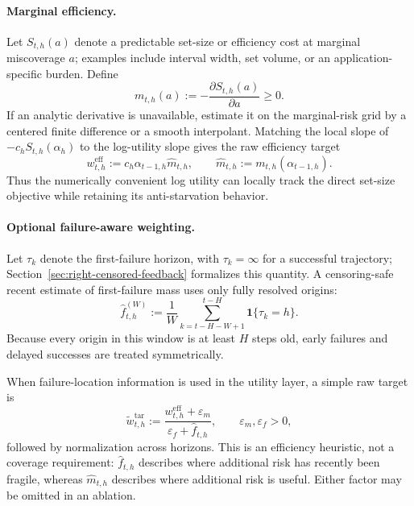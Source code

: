 \documentclass[11pt]{article}
\begin{document}
\paragraph{Marginal efficiency.}
Let $S_{t,h}(a)$ denote a predictable set-size or efficiency cost at marginal
miscoverage $a$; examples include interval width, set volume, or an
application-specific burden.  Define
\begin{equation}
    m_{t,h}(a)
    :=
    -\frac{\partial S_{t,h}(a)}{\partial a}\ge0.
    \label{eq:marginal-set-efficiency}
\end{equation}
If an analytic derivative is unavailable, estimate it on the marginal-risk
grid by a centered finite difference or a smooth interpolant.  Matching the
local slope of $-c_hS_{t,h}(\alpha_h)$ to the log-utility slope gives the raw
efficiency target
\begin{equation}
\boxed{
    w_{t,h}^{\mathrm{eff}}
    :=
    c_h\alpha_{t-1,h}\widehat m_{t,h},
    \qquad
    \widehat m_{t,h}:=m_{t,h}(\alpha_{t-1,h}).
}
\label{eq:efficiency-target-weight}
\end{equation}
Thus the numerically convenient log utility can locally track the direct
set-size objective while retaining its anti-starvation behavior.

\paragraph{Optional failure-aware weighting.}
Let $\tau_k$ denote the first-failure horizon, with $\tau_k=\infty$ for a
successful trajectory; Section~\ref{sec:right-censored-feedback} formalizes
this quantity.  A censoring-safe recent estimate of first-failure mass uses
only fully resolved origins:
\begin{equation}
    \widehat f_{t,h}^{(W)}
    :=
    \frac1W
    \sum_{k=t-H-W+1}^{t-H}
    \mathbf 1\{\tau_k=h\}.
    \label{eq:first-failure-mass-estimator}
\end{equation}
Because every origin in this window is at least $H$ steps old, early failures
and delayed successes are treated symmetrically.

When failure-location information is used in the utility layer, a simple raw
target is
\begin{equation}
    \widetilde w_{t,h}^{\mathrm{tar}}
    :=
    \frac{w_{t,h}^{\mathrm{eff}}+\varepsilon_m}
         {\varepsilon_f+\widehat f_{t,h}},
    \qquad
    \varepsilon_m,\varepsilon_f>0,
    \label{eq:raw-failure-aware-weight}
\end{equation}
followed by normalization across horizons.  This is an efficiency heuristic,
not a coverage requirement: $\widehat f_{t,h}$ describes where additional risk
has recently been fragile, whereas $\widehat m_{t,h}$ describes where
additional risk is useful.  Either factor may be omitted in an ablation.
\end{document}
